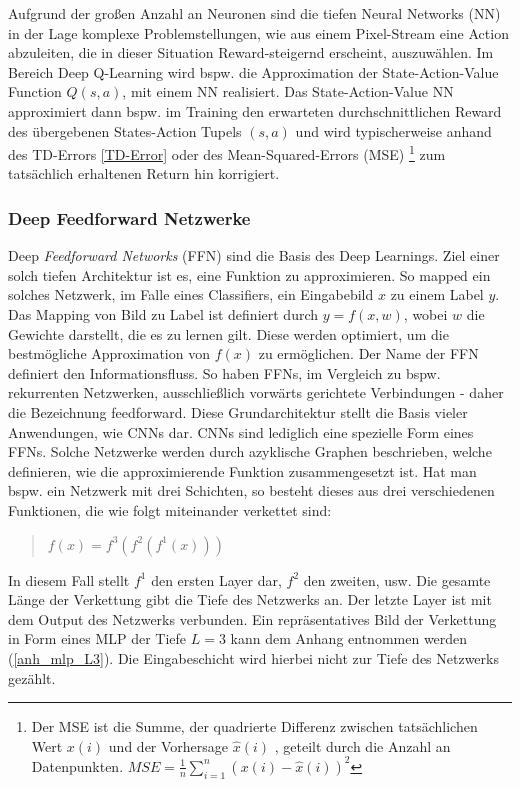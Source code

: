 Aufgrund der großen Anzahl an Neuronen sind die tiefen Neural Networks (NN) in der Lage komplexe Problemstellungen, wie aus einem Pixel-Stream eine Action abzuleiten, die in dieser Situation Reward-steigernd erscheint, auszuwählen. Im Bereich Deep Q-Learning wird bspw. die Approximation der State-Action-Value Function $Q(s,a)$, mit einem NN realisiert. Das State-Action-Value NN approximiert dann bspw. im Training den erwarteten durchschnittlichen Reward des übergebenen States-Action Tupels $(s,a)$ und wird typischerweise anhand des TD-Errors \ref{TD-Error} oder des Mean-Squared-Errors (MSE) \footnote{\label{foot:absch_RL_deepL_mse} Der MSE ist die Summe, der quadrierte Differenz zwischen tatsächlichen Wert $x(i)$ und der Vorhersage $\hat{x}(i)$ , geteilt durch die Anzahl an Datenpunkten. $MSE =  \frac{1}{n} \sum \limits_{i=1}^n ( x( i ) - \hat{x}(i))^2 $ } zum tatsächlich erhaltenen Return hin korrigiert. 



\subsubsection{Deep Feedforward Netzwerke}\label{absch_RL_deepL_FFN}
Deep \emph{Feedforward Networks} (FFN) sind die Basis des Deep Learnings. Ziel einer solch tiefen Architektur ist es, eine Funktion zu approximieren. So mapped ein solches Netzwerk, im Falle eines Classifiers, ein Eingabebild $x$ zu einem Label $y$. Das Mapping von Bild zu Label ist definiert durch $y = f(x,w)$, wobei $w$ die Gewichte darstellt, die es zu lernen gilt. Diese werden optimiert, um die bestmögliche Approximation von $f(x)$ zu ermöglichen. Der Name der FFN definiert den Informationsfluss. So haben FFNs, im Vergleich zu bspw. rekurrenten Netzwerken, ausschließlich vorwärts gerichtete Verbindungen - daher die Bezeichnung feedforward. Diese Grundarchitektur stellt die Basis vieler Anwendungen, wie CNNs dar. CNNs sind lediglich eine spezielle Form eines FFNs. Solche Netzwerke werden durch azyklische Graphen beschrieben, welche definieren, wie die approximierende Funktion zusammengesetzt ist. Hat man bspw. ein Netzwerk mit drei Schichten, so besteht dieses aus drei verschiedenen Funktionen, die wie folgt miteinander verkettet sind: 

\begin{quotation}
\centering
   \( f(x) = f^3 (f^2 ( f^1 (x))) \)
\end{quotation}

In diesem Fall stellt $f^1$ den ersten Layer dar, $f^2$ den zweiten, usw. Die gesamte Länge der Verkettung gibt die Tiefe des Netzwerks an. Der letzte Layer ist mit dem Output des Netzwerks verbunden. Ein repräsentatives Bild der Verkettung in Form eines MLP der Tiefe $L=3$ kann dem Anhang entnommen werden (\ref{anh_mlp_L3}). Die Eingabeschicht wird hierbei nicht zur Tiefe des Netzwerks gezählt. 


